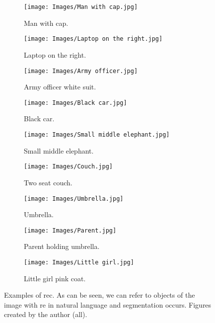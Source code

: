 \begin{figure}[tp]
  \centering
  \begin{subfigure}[t]{.32\textwidth}
    \centering
    \caption{Man with cap.}\label{fig:rec-man}
    \texttt{[image: Images/Man with cap.jpg]}
  \end{subfigure}\hfill
  \begin{subfigure}[t]{.32\textwidth}
    \centering
    \caption{Laptop on the right.}\label{fig:rec-laptop}
    \texttt{[image: Images/Laptop on the right.jpg]}
  \end{subfigure}\hfill
  \begin{subfigure}[t]{.32\textwidth}
    \centering
    \caption{Army officer white suit.}\label{fig:rec-army}
    \texttt{[image: Images/Army officer.jpg]}
  \end{subfigure}

  \bigskip
  \begin{subfigure}[t]{.32\textwidth}
    \centering
    \caption{Black car.}\label{fig:rec-car}
    \texttt{[image: Images/Black car.jpg]}
  \end{subfigure}\hfill
  \begin{subfigure}[t]{.32\textwidth}
    \centering
    \caption{Small middle elephant.}\label{fig:rec-elephant}
    \texttt{[image: Images/Small middle elephant.jpg]}
  \end{subfigure}\hfill
  \begin{subfigure}[t]{.32\textwidth}
    \centering
    \caption{Two seat couch.}\label{fig:rec-couch}
    \texttt{[image: Images/Couch.jpg]}
  \end{subfigure}

  \bigskip
  \begin{subfigure}[t]{.32\textwidth}
    \centering
    \caption{Umbrella.}\label{fig:rec-umbrella}
    \texttt{[image: Images/Umbrella.jpg]}
  \end{subfigure}\hfill
  \begin{subfigure}[t]{.32\textwidth}
    \centering
    \caption{Parent holding umbrella.}\label{fig:rec-parent}
    \texttt{[image: Images/Parent.jpg]}
  \end{subfigure}\hfill
  \begin{subfigure}[t]{.32\textwidth}
    \centering
    \caption{Little girl pink coat.}\label{fig:rec-girl}
    \texttt{[image: Images/Little girl.jpg]}
  \end{subfigure}
  \caption[Examples of \acl*{rec}]{Examples of \acl{rec}. As can be seen, we
    can refer to objects of the image with \gls{re} in natural language and
    segmentation occurs. Figures created by the author (all).}\label{fig:rec-examples}
\end{figure}



